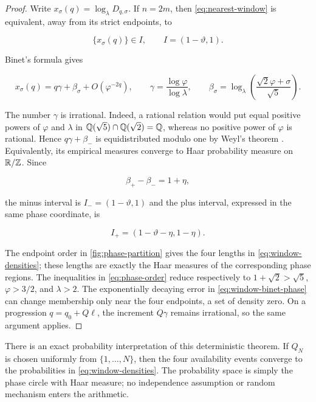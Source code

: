 \begin{proof}
Write $x_\sigma(q)=\log_\lambda D_{q,\sigma}$. If $n=2m$, then
\cref{eq:nearest-window} is equivalent, away from its strict endpoints, to

\begin{equation}
 \{x_\sigma(q)\}\in I,
 \qquad
 I=(1-\vartheta,1).
 \label{eq:single-window-interval}
\end{equation}

Binet's formula gives

\begin{equation}
 x_\sigma(q)=q\gamma+\beta_\sigma+O(\varphi^{-2q}),
 \qquad
 \gamma=\frac{\log\varphi}{\log\lambda},
 \qquad
 \beta_\sigma=\log_\lambda\left(
  \frac{\sqrt2\varphi+\sigma}{\sqrt5}
 \right).
 \label{eq:window-binet-phase}
\end{equation}

The number $\gamma$ is irrational. Indeed, a rational relation would put
equal positive powers of $\varphi$ and $\lambda$ in
$\mathbb{Q}(\sqrt5)\cap\mathbb{Q}(\sqrt2)=\mathbb{Q}$, whereas no positive power of $\varphi$ is
rational. Hence $q\gamma+\beta_-$ is equidistributed modulo one by Weyl's
theorem \cite{Weyl1916}. Equivalently, its empirical measures converge to
Haar probability measure on $\mathbb{R}/\mathbb{Z}$. Since

\begin{equation}
 \beta_+-\beta_-=1+\eta,
\end{equation}

the minus interval is $I_-=(1-\vartheta,1)$ and the plus interval, expressed
in the same phase coordinate, is

\begin{equation}
 I_+=(1-\vartheta-\eta,1-\eta).
 \label{eq:two-window-intervals}
\end{equation}

The endpoint order in \cref{fig:phase-partition} gives the four lengths in
\cref{eq:window-densities}; these lengths are exactly the Haar measures of
the corresponding phase regions. The inequalities in
\cref{eq:phase-order} reduce respectively to
$1+\sqrt2>\sqrt5$, $\varphi>3/2$, and $\lambda>2$. The exponentially
decaying error in \cref{eq:window-binet-phase} can change membership only
near the four endpoints, a set of density zero. On a progression
$q=q_0+Q\ell$, the increment $Q\gamma$ remains irrational, so the same
argument applies.
\end{proof}

There is an exact probability interpretation of this deterministic theorem.
If $Q_N$ is chosen uniformly from $\{1,\ldots,N\}$, then the four
availability events converge to the probabilities in
\cref{eq:window-densities}. The probability space is simply the phase circle
with Haar measure; no independence assumption or random mechanism enters
the arithmetic.

